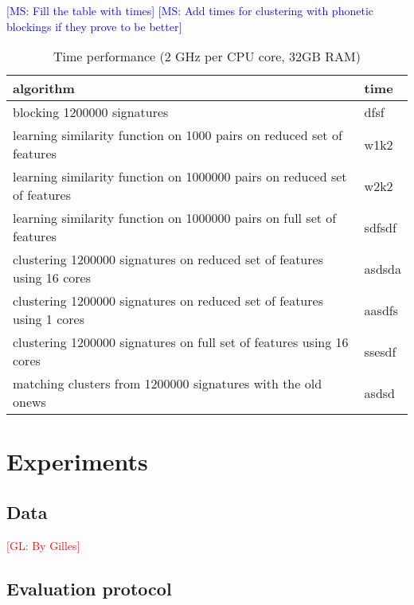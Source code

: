 \documentclass{article}
\newcommand{\glnote}[1]{\textcolor{red}{[GL: #1]}}
\newcommand{\msnote}[1]{\textcolor{blue}{[MS: #1]}}
\begin{document}
\msnote{Fill the table with times}
\msnote{Add times for clustering with phonetic blockings if they prove to be better}

\FloatBarrier
\begin{table}[H]
\caption{Time performance (2 GHz per CPU core, 32GB RAM)}
\centering
\begin{tabular}{|l|l|}
  \hline
  \textbf{algorithm} & \textbf{time}\\
  \hline
  blocking 1200000 signatures & dfsf \\
  \hline
  learning similarity function on 1000 pairs on reduced set of features & w1k2\\
  \hline
  learning similarity function on 1000000 pairs on reduced set of features & w2k2 \\
  \hline
  learning similarity function on 1000000 pairs on full set of features & sdfsdf \\
  \hline
  clustering 1200000 signatures on reduced set of features using 16 cores & asdsda \\
  \hline
  clustering 1200000 signatures on reduced set of features using 1 cores & aasdfs \\
  \hline
  clustering 1200000 signatures on full set of features using 16 cores & ssesdf \\
  \hline
  matching clusters from 1200000 signatures with the old onews & asdsd \\
  \hline
\end{tabular}
\end{table}




\section{Experiments}
\label{experiments}

\subsection{Data}

\glnote{By Gilles}


\subsection{Evaluation protocol}
\end{document}
